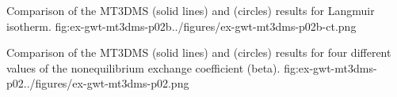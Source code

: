 \begin{StandardFigure}
	{Comparison of the MT3DMS (solid lines) and \mf (circles) results for Langmuir isotherm.}
	{fig:ex-gwt-mt3dms-p02b}{../figures/ex-gwt-mt3dms-p02b-ct.png}
\end{StandardFigure}

\begin{StandardFigure}
	{Comparison of the MT3DMS (solid lines) and \mf (circles) results for four different values of the nonequilibrium exchange coefficient (beta).}
	{fig:ex-gwt-mt3dms-p02}{../figures/ex-gwt-mt3dms-p02.png}
\end{StandardFigure}




